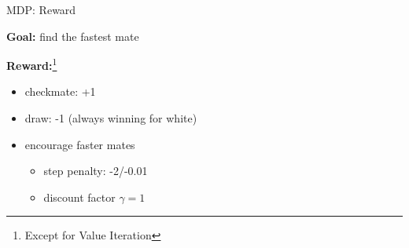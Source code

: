 \begin{frame}{MDP: Reward}

  \textbf{Goal:} find the fastest mate

  \textbf{Reward:}\footnote{\tiny{Except for Value Iteration}}

  \begin{itemize}
    \item checkmate: +1
    \item draw: -1 (always winning for white)
    \item encourage faster mates 
    \begin{itemize}
      \item step penalty: -2/-0.01
      \item discount factor $\gamma = 1$
    \end{itemize}
  \end{itemize}

\end{frame}